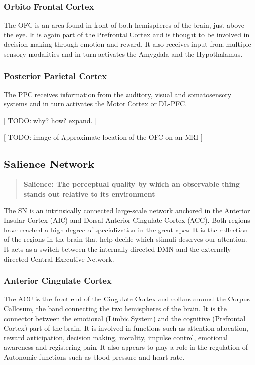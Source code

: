 \documentclass[twocolumn]{article}
\begin{document}
\subsubsection{Orbito Frontal Cortex}

The OFC is an area found in front of both hemispheres of the brain, just above the
eye. It is again part of the Prefrontal Cortex and is thought to be involved in
decision making through emotion and reward. It also receives input from multiple
sensory modalities and in turn activates the Amygdala and the
Hypothalamus. \cite{theprefrontalcortex,ofcprimates,theorbitofrontalcortex}


\subsubsection{Posterior Parietal Cortex}

The PPC receives information from the auditory, visual and somatosensory systems and
in turn activates the Motor Cortex or DL-PFC. \cite{parietallobes}

[ TODO: why? how? expand. ]

[ TODO: image of Approximate location of the OFC on an MRI ]

\subsection{Salience Network}

\begin{quote}
  \textbf{Salience: The perceptual quality by which an observable thing stands out
    relative to its environment}
\end{quote}

The SN is an intrinsically connected large-scale network anchored in the Anterior
Insular Cortex (AIC) and Dorsal Anterior Cingulate Cortex (ACC). Both regions have reached a
high degree of specialization in the great apes. It is the collection of the regions
in the brain that help decide which stimuli deserves our attention. It acts as a
switch between the internally-directed DMN and the externally-directed Central
Executive Network. \cite{saliencenetwork}

\subsubsection{Anterior Cingulate Cortex}

The ACC is the front end of the Cingulate Cortex and collars around the Corpus
Callosum, the band connecting the two hemispheres of the brain. It is the connector
between the emotional (Limbic System) and the cognitive (Prefrontal Cortex) part of
the brain. It is involved in functions such as attention allocation, reward
anticipation, decision making, morality, impulse control, emotional awareness and
registering pain. \cite{accstroop,accreward,snmorality,empathypain,acccognitive} It
also appears to play a role in the regulation of Autonomic functions such as blood
pressure and heart rate. \cite{accbloodpressure}
\end{document}
